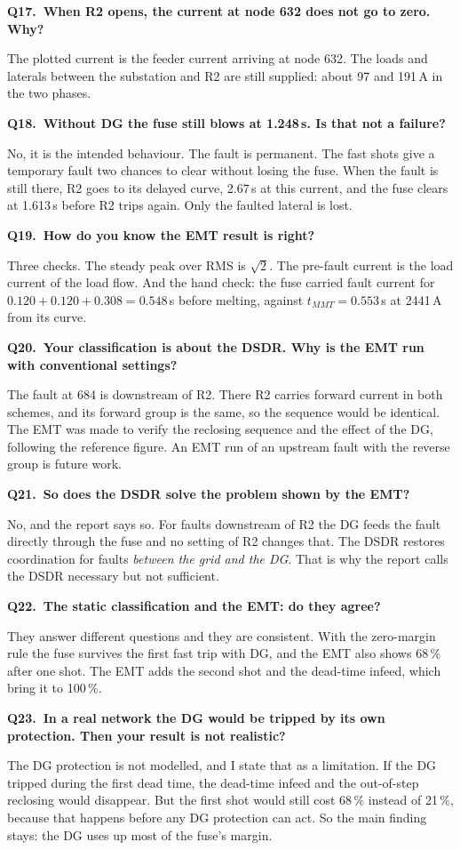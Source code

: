 \documentclass[11pt,a4paper]{article}
\newcommand{\sub}[1]{\needspace{5\baselineskip}\medskip{\large\color{navy}\bfseries #1}\par}
\newcommand{\q}[2]{\par\needspace{4\baselineskip}\medskip\noindent\textbf{Q#1.\ #2}\par\noindent}
\begin{document}
\q{17}{When R2 opens, the current at node 632 does not go to zero. Why?}
The plotted current is the feeder current arriving at node 632. The loads and laterals between the substation
and R2 are still supplied: about 97 and 191\,A in the two phases.

\q{18}{Without DG the fuse still blows at 1.248\,s. Is that not a failure?}
No, it is the intended behaviour. The fault is permanent. The fast shots give a temporary fault two chances
to clear without losing the fuse. When the fault is still there, R2 goes to its delayed curve, 2.67\,s at this
current, and the fuse clears at 1.613\,s before R2 trips again. Only the faulted lateral is lost.

\q{19}{How do you know the EMT result is right?}
Three checks. The steady peak over RMS is $\sqrt{2}$. The pre-fault current is the load current of the load
flow. And the hand check: the fuse carried fault current for $0.120+0.120+0.308=0.548$\,s before melting,
against $t_{MMT}=0.553$\,s at 2441\,A from its curve.

\sub{Tricky ones}
\q{20}{Your classification is about the DSDR. Why is the EMT run with conventional settings?}
The fault at 684 is downstream of R2. There R2 carries forward current in both schemes, and its forward group
is the same, so the sequence would be identical. The EMT was made to verify the reclosing sequence and the
effect of the DG, following the reference figure. An EMT run of an upstream fault with the reverse group is
future work.

\q{21}{So does the DSDR solve the problem shown by the EMT?}
No, and the report says so. For faults downstream of R2 the DG feeds the fault directly through the fuse and
no setting of R2 changes that. The DSDR restores coordination for faults \emph{between the grid and the DG}.
That is why the report calls the DSDR necessary but not sufficient.

\q{22}{The static classification and the EMT: do they agree?}
They answer different questions and they are consistent. With the zero-margin rule the fuse survives the
first fast trip with DG, and the EMT also shows 68\,\% after one shot. The EMT adds the second shot and the
dead-time infeed, which bring it to 100\,\%.

\q{23}{In a real network the DG would be tripped by its own protection. Then your result is not realistic?}
The DG protection is not modelled, and I state that as a limitation. If the DG tripped during the first dead
time, the dead-time infeed and the out-of-step reclosing would disappear. But the first shot would still cost
68\,\% instead of 21\,\%, because that happens before any DG protection can act. So the main finding stays: the
DG uses up most of the fuse's margin.
\end{document}
